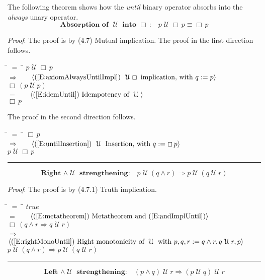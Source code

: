 \documentclass[12pt, fleqn, leqno]{article}
\newcommand{\lgap}{2pt}                             %
\newcommand{\mymathindent}{24pt}                    %
\newcommand{\impl}{\ensuremath{\Rightarrow}}        %
\newcommand{\Until}{\;\mathcal{U}\;}
\newcommand{\Always}{\Box\,}
\newcommand{\myqed}{\rule[-.23ex]{1.2ex}{2.0ex}}
\newcommand{\myqedtab}{\hspace{384pt}}              %
\newcommand{\Gll} {\langle}                         %
\newcommand{\Ggg} {\rangle}                         %
\newcommand{\Hint}[1]     {\ \ \ $\Gll              \mbox{#1} \Ggg$ }   %
\begin{document}
The following theorem shows how the \textit{until} binary operator absorbs into the \textit{always} unary operator.
\begin{equation}\label{E:absUntilAlways}
\textbf{Absorption of $\Until$ into $\Always$:}\quad p \Until \Always p \equiv \Always p
\end{equation}

\emph{Proof}: The proof is by (4.7) Mutual implication.
The proof in the first direction follows.
\begin{tabbing}
\hspace{\mymathindent} \= $= \;$ \= \myqedtab \= \kill
\> \> $p \Until \Always p$\\[\lgap]
\> $\impl$ \> \Hint{(\ref{E:axiomAlwaysUntilImpl}) $\Until\Always$ implication, with $q:=p$} \\[\lgap]
\> \> $\Always (p \Until p)$\\[\lgap]
\> $=$ \> \Hint{(\ref{E:idemUntil}) Idempotency of $\Until$} \\[\lgap]
\> \> $\Always p$
\end{tabbing}
The proof in the second direction follows.
\begin{tabbing}
\hspace{\mymathindent} \= $= \;$ \= \myqedtab \= \kill
\> \> $\Always p$\\[\lgap]
\> $\impl$ \> \Hint{(\ref{E:untilInsertion}) $\Until$ Insertion, with $q:=\Always p$} \\[\lgap]
\> \> $p \Until \Always p$ \quad \myqed
\end{tabbing}
\begin{equation}\label{E:untilAndImplUntilUntil}
\textbf{Right $\land\Until$ strengthening:}\quad p\Until(q \land r) \impl p\Until(q\Until r)
\end{equation}

\emph{Proof}: The proof is by (4.7.1) Truth implication.
\begin{tabbing}
\hspace{\mymathindent} \= $= \;$ \= \myqedtab \= \kill
  \> \>   $true$\\[\lgap]
  \> $=$ \> \Hint{(\ref{E:metatheorem}) Metatheorem and (\ref{E:andImplUntil})} \\[\lgap]
  \> \>   $\Always (q \land r \impl q\Until r)$\\[\lgap]
  \> $\impl$  \>  \Hint{(\ref{E:rightMonoUntil}) Right monotonicity of $\Until$ with $p,q,r := q \land r, q\Until r,p$}\\[\lgap]
  \> \>   $p\Until (q \land r)\impl p\Until (q\Until r)$ \quad \myqed
\end{tabbing}
\begin{equation}\label{E:andUntilImplUntilUntil}
\textbf{Left $\land\Until$ strengthening:}\quad (p \land q) \Until r \impl (p\Until q)\Until r
\end{equation}
\end{document}
